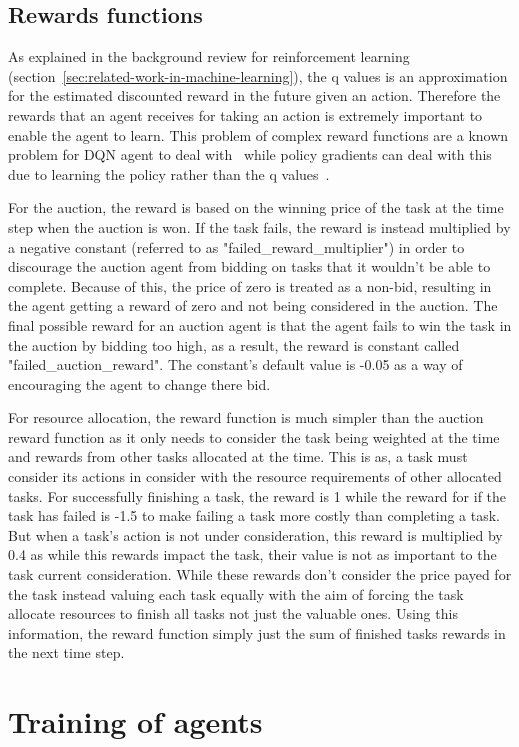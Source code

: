 \subsection{Rewards functions}\label{subsec:rewards-functions}
As explained in the background review for reinforcement learning (section~\ref{sec:related-work-in-machine-learning}),
the q values is an approximation for the estimated discounted reward in the future given an action. Therefore the
rewards that an agent receives for taking an action is extremely important to enable the agent to learn. This problem
of complex reward functions are a known problem for DQN agent to deal with~\citep{atari} while policy gradients can
deal with this due to learning the policy rather than the q values~\citep{Sutton1998}.

For the auction, the reward is based on the winning price of the task at the time step when the auction is won. If the
task fails, the reward is instead multiplied by a negative constant (referred to as "failed_reward_multiplier") in
order to discourage the auction agent from bidding on tasks that it wouldn't be able to complete. Because of this,
the price of zero is treated as a non-bid, resulting in the agent getting a reward of zero and not being considered in
the auction. The final possible reward for an auction agent is that the agent fails to win the task in the auction by
bidding too high, as a result, the reward is constant called "failed_auction_reward". The constant's default value is
-0.05 as a way of encouraging the agent to change there bid.

For resource allocation, the reward function is much simpler than the auction reward function as it only needs to
consider the task being weighted at the time and rewards from other tasks allocated at the time. This is as,
a task must consider its actions in consider with the resource requirements of other allocated tasks. For successfully
finishing a task, the reward is 1 while the reward for if the task has failed is -1.5 to make failing a task more
costly than completing a task. But when a task's action is not under consideration, this reward is multiplied by
0.4 as while this rewards impact the task, their value is not as important to the task current consideration.
While these rewards don't consider the price payed for the task instead valuing each task equally with the aim of
forcing the task allocate resources to finish all tasks not just the valuable ones. Using this information, the reward
function simply just the sum of finished tasks rewards in the next time step.

\section{Training of agents}\label{sec:training-of-agents}

